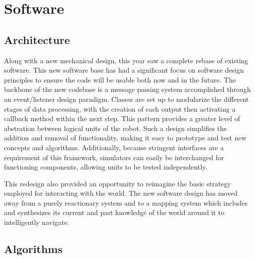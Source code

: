 \section{Software}
\subsection{Architecture}
Along with a new mechanical design, this year saw a complete rebase of existing software. This new software base has had a significant focus on software design principles to ensure the code will be usable both now and in the future. The backbone of the new codebase is a message passing system accomplished through an event/listener design paradigm. Classes are set up to modularize the different stages of data processing, with the creation of each output then activating a callback method within the next step. This pattern provides a greater level of abstration between logical units of the robot. Such a design simplifies the addition and removal of functionality, making it easy to prototype and test new concepts and algorithms. Additionally, because stringent interfaces are a requirement of this framework, simulators can easily be interchanged for functioning components, allowing units to be tested independently.

This redesign also provided an opportunity to reimagine the basic strategy employed for interacting with the world. The new software design has moved away from a purely reactionary system and to a mapping system which includes and synthesizes its current and past knowledge of the world around it to intelligently navigate.

\subsection{Algorithms}
